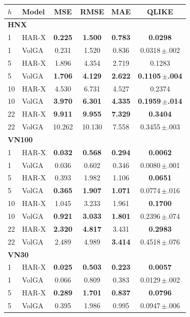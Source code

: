 \begin{tabular}{llcccc}
\toprule
$h$ & Model & MSE & RMSE & MAE & QLIKE \\
\midrule
\multicolumn{6}{l}{\textbf{HNX}} \\
1 & HAR-X & \textbf{0.225} & \textbf{1.500} & \textbf{0.783} & \textbf{0.0298} \\
1 & VolGA & 0.231 & 1.520 & 0.836 & 0.0318\,$\pm$.002 \\
5 & HAR-X & 1.896 & 4.354 & 2.719 & 0.1283 \\
5 & VolGA & \textbf{1.706} & \textbf{4.129} & \textbf{2.622} & \textbf{0.1105\,$\pm$.004} \\
10 & HAR-X & 4.530 & 6.731 & 4.527 & 0.2374 \\
10 & VolGA & \textbf{3.970} & \textbf{6.301} & \textbf{4.335} & \textbf{0.1959\,$\pm$.014} \\
22 & HAR-X & \textbf{9.911} & \textbf{9.955} & \textbf{7.329} & \textbf{0.3404} \\
22 & VolGA & 10.262 & 10.130 & 7.558 & 0.3455\,$\pm$.003 \\
\midrule
\multicolumn{6}{l}{\textbf{VN100}} \\
1 & HAR-X & \textbf{0.032} & \textbf{0.568} & \textbf{0.294} & \textbf{0.0062} \\
1 & VolGA & 0.036 & 0.602 & 0.346 & 0.0080\,$\pm$.001 \\
5 & HAR-X & 0.393 & 1.982 & 1.106 & \textbf{0.0651} \\
5 & VolGA & \textbf{0.365} & \textbf{1.907} & \textbf{1.071} & 0.0774\,$\pm$.016 \\
10 & HAR-X & 1.045 & 3.233 & 1.961 & \textbf{0.1700} \\
10 & VolGA & \textbf{0.921} & \textbf{3.033} & \textbf{1.801} & 0.2396\,$\pm$.074 \\
22 & HAR-X & \textbf{2.320} & \textbf{4.817} & 3.431 & \textbf{0.2983} \\
22 & VolGA & 2.489 & 4.989 & \textbf{3.414} & 0.4518\,$\pm$.076 \\
\midrule
\multicolumn{6}{l}{\textbf{VN30}} \\
1 & HAR-X & \textbf{0.025} & \textbf{0.503} & \textbf{0.223} & \textbf{0.0057} \\
1 & VolGA & 0.066 & 0.809 & 0.383 & 0.0129\,$\pm$.002 \\
5 & HAR-X & \textbf{0.289} & \textbf{1.701} & \textbf{0.837} & \textbf{0.0796} \\
5 & VolGA & 0.395 & 1.986 & 0.995 & 0.0947\,$\pm$.006 \\

\end{tabular}

